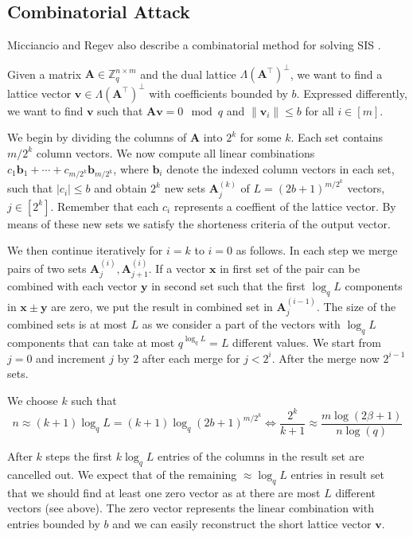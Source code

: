 \subsection[Combinatorial Attack]{Combinatorial Attack \cite{MR09}}
Micciancio and Regev also describe a combinatorial method for solving SIS \cite{MR09}.

Given a matrix $\mathbf{A} \in \mathbb{Z}_q^{n \times m}$ and the dual lattice $\Lambda(\mathbf{A}^\intercal)^{\perp}$, we want to find a lattice vector $\mathbf{v} \in \Lambda(\mathbf{A}^\intercal)^{\perp}$ with coefficients bounded by $b$. Expressed differently, we want to find $\mathbf{v}$ such that $\mathbf{A}\mathbf{v} = 0 \mod q$ and $\|\mathbf{v}_i\| \leq b$ for all $i \in [m]$.

We begin by dividing the columns of $\mathbf{A}$ into $2^k$ for some $k$. Each set contains $m/2^k$ column vectors. We now compute all linear combinations $c_1 \mathbf{b}_1 + \cdots + c_{m/2^k}\mathbf{b}_{m/2^k}$, where $\mathbf{b}_i$ denote the indexed column vectors in each set, such that $|c_i| \leq b$ and obtain $2^k$ new sets $\mathbf{A}_j^{(k)}$ of $L=(2b+1)^{m/2^k}$ vectors, $j\in \left[2^k\right]$. Remember that each $c_i$ represents a coeffient of the lattice vector. By means of these new sets we satisfy the shorteness criteria of the output vector.

We then continue iteratively for $i=k$ to $i=0$ as follows. In each step we merge pairs of two sets $\mathbf{A}_j^{(i)}, \mathbf{A}_{j+1}^{(i)}$. If a vector $\mathbf{x}$ in first set of the pair can be combined with each vector $\mathbf{y}$ in second set such that the first $\log_q L$ components in $\mathbf{x} \pm \mathbf{y}$ are zero, we put the result in combined set in $\mathbf{A}_j^{(i-1)}$. The size of the combined sets is at most $L$ as we consider a part of the vectors with $\log_q L$ components that can take at most $q^{\log_q L} = L$ different values. We start from $j=0$ and increment $j$ by $2$ after each merge for $j<2^i$.
After the merge now $2^{i-1}$ sets.

We choose $k$ such that
\begin{equation}
  n \approx (k+1) \log_q L = (k+1) \log_q (2b+1)^{m/2^k} \iff \frac{2^k}{k+1} \approx \frac{m \log(2\beta + 1)}{n \log(q)}
\end{equation}

After $k$ steps the first $k \log_q L$ entries of the columns in the result set are cancelled out. We expect that of the remaining $\approx \log_q L$ entries in result set that we should find at least one zero vector as at there are most $L$ different vectors (see above). The zero vector represents the linear combination with entries bounded by $b$ and we can easily reconstruct the short lattice vector $\mathbf{v}$.

